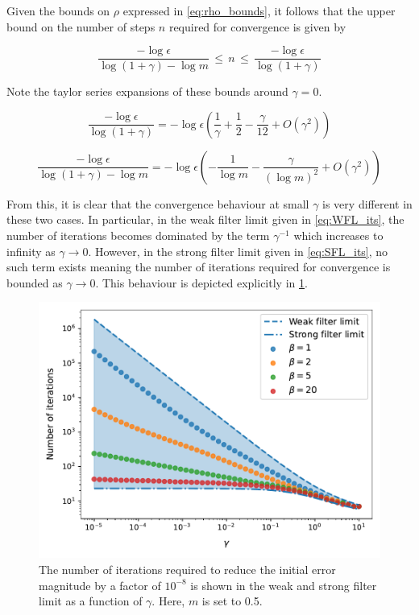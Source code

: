 Given the bounds on $\rho$ expressed in \cref{eq:rho_bounds}, it follows that the upper bound on the number of steps $n$ required for convergence is given by 

\begin{equation}
    \frac{-\log \epsilon}{\log(1 + \gamma) - \log m} \, \leq \, n \, \leq \, \frac{-\log \epsilon}{\log(1 + \gamma)}
\end{equation}

Note the taylor series expansions of these bounds around $\gamma=0$. 

\begin{equation}
    \label{eq:WFL_its}
    \frac{-\log \epsilon}{\log(1 + \gamma)} = - \log \epsilon \left( \frac{1}{\gamma} + \frac{1}{2} - \frac{\gamma}{12} + O(\gamma^2) \right) 
\end{equation}

\begin{equation}
    \label{eq:SFL_its}
    \frac{-\log \epsilon}{\log(1 + \gamma) - \log m} = - \log \epsilon \left( -\frac{1}{\log m} - \frac{\gamma}{(\log m)^2} + O(\gamma^2)\right) 
\end{equation}

From this, it is clear that the convergence behaviour at small $\gamma$ is very different in these two cases. In particular, in the weak filter limit given in \cref{eq:WFL_its}, the number of iterations becomes dominated by the term $\gamma^{-1}$ which increases to infinity as $\gamma \rightarrow 0$. However, in the strong filter limit given in \cref{eq:SFL_its}, no such term exists meaning the number of iterations required for convergence is bounded as $\gamma \rightarrow 0$. This behaviour is depicted explicitly in \cref{fig:gamma_its}. 


\begin{figure}[t]
    \includegraphics[width=0.8\linewidth]{Figures/it_gamma_plot.pdf}
    \caption{\small{ The number of iterations required to reduce the initial error magnitude by a factor of $10^{-8}$ is shown in the weak and strong filter limit as a function of $\gamma$. Here, $m$ is set to 0.5.}}
    \label{fig:gamma_its}
\end{figure} 

